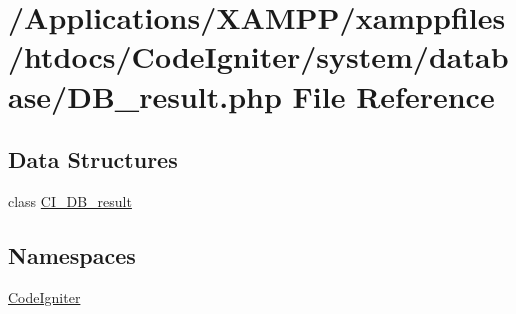 \hypertarget{_d_b__result_8php}{}\section{/\+Applications/\+X\+A\+M\+P\+P/xamppfiles/htdocs/\+Code\+Igniter/system/database/\+D\+B\+\_\+result.php File Reference}
\label{_d_b__result_8php}
\subsection*{Data Structures}
\begin{DoxyCompactItemize}
\item 
class \mbox{\hyperlink{class_c_i___d_b__result}{C\+I\+\_\+\+D\+B\+\_\+result}}
\end{DoxyCompactItemize}
\subsection*{Namespaces}
\begin{DoxyCompactItemize}
\item 
 \mbox{\hyperlink{namespace_code_igniter}{Code\+Igniter}}
\end{DoxyCompactItemize}
